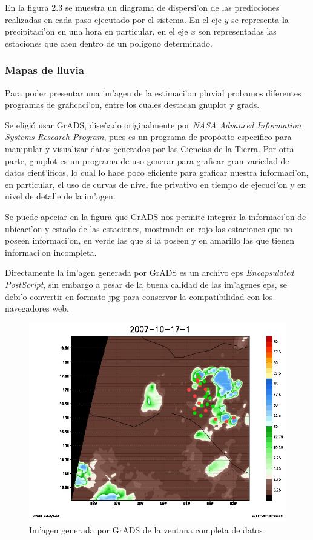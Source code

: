En la figura 2.3 se muestra un diagrama de dispersi'on de las predicciones realizadas en cada paso ejecutado por el sistema.
En el eje ${y}$ se representa la precipitaci'on en una hora en particular, 
en el eje $x$ son representadas las estaciones que caen dentro de un poligono
determinado. 


\subsubsection*{Mapas de lluvia}

Para poder presentar una im'agen de la estimaci'on pluvial probamos diferentes programas de graficaci'on, entre los cuales
destacan gnuplot y grads.

Se eligió usar GrADS, dise\~nado originalmente por \textit{ NASA Advanced Information Systems Research Program}, 
pues es un programa de propósito específico para manipular y visualizar datos generados por las Ciencias 
de la Tierra. Por otra parte, gnuplot es un programa de uso generar para graficar gran variedad de datos cient'ificos, lo cual
lo hace poco eficiente para graficar nuestra informaci'on, en particular, el uso de curvas de nivel fue privativo en tiempo
de ejecuci'on y en nivel de detalle de la im'agen.

Se puede apeciar en la figura que GrADS nos permite integrar la informaci'on de ubicaci'on y estado de las estaciones,
mostrando en rojo las estaciones que no poseen informaci'on, en verde las que si la poseen y en amarillo las que 
tienen informaci'on incompleta.

Directamente la im'agen generada por GrADS es un archivo eps \textit{Encapsulated PostScript}, sin embargo a pesar de la buena calidad
de las im'agenes eps, se debi'o convertir en formato jpg para conservar la compatibilidad con los navegadores web.

\begin{figure}[h!]
 \centering
 \includegraphics[width=120mm]{./imagenes/2007_10_17_1.jpg}
 \caption{Im'agen generada por GrADS de la ventana completa de datos}
\end{figure}

